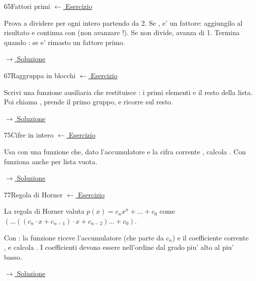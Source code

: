 \label{hint:65}
\begin{hintbox}{65}{Fattori primi}
\small\color{black!55}\hyperref[ex:65]{$\leftarrow$ Esercizio}\normalsize\color{black}

Prova a dividere  per ogni intero  partendo da 2.
Se ,  e' un fattore: aggiungilo al risultato
e continua con  (non avanzare !).
Se  non divide, avanza  di 1.
Termina quando : se  e' rimasto
un fattore primo.

\small\color{black!55}\hyperref[sol:65]{$\rightarrow$ Soluzione}\normalsize\color{black}
\end{hintbox}

\label{hint:67}
\begin{hintbox}{67}{Raggruppa in blocchi}
\small\color{black!55}\hyperref[ex:67]{$\leftarrow$ Esercizio}\normalsize\color{black}

Scrivi una funzione ausiliaria  che restituisce
: i primi  elementi e il resto della lista.
Poi  chiama , prende il primo gruppo,
e ricorre sul resto.

\small\color{black!55}\hyperref[sol:67]{$\rightarrow$ Soluzione}\normalsize\color{black}
\end{hintbox}


\label{hint:75}
\begin{hintbox}{75}{Cifre in intero}
\small\color{black!55}\hyperref[ex:75]{$\leftarrow$ Esercizio}\normalsize\color{black}

Usa  con una funzione che, dato l'accumulatore 
e la cifra corrente , calcola .
Con  funziona anche per lista vuota.

\small\color{black!55}\hyperref[sol:75]{$\rightarrow$ Soluzione}\normalsize\color{black}
\end{hintbox}

\label{hint:77}
\begin{hintbox}{77}{Regola di Horner}
\small\color{black!55}\hyperref[ex:77]{$\leftarrow$ Esercizio}\normalsize\color{black}

La regola di Horner valuta $p(x) = c_n x^n + \ldots + c_0$
come $(\ldots((c_n \cdot x + c_{n-1}) \cdot x + c_{n-2})\ldots + c_0)$.

Con : la funzione riceve l'accumulatore 
(che parte da $c_n$) e il coefficiente corrente ,
e calcola .
I coefficienti devono essere nell'ordine dal grado piu' alto
al piu' basso.

\small\color{black!55}\hyperref[sol:77]{$\rightarrow$ Soluzione}\normalsize\color{black}
\end{hintbox}

